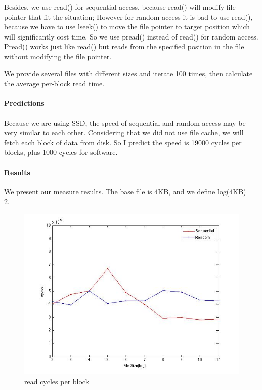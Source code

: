 Besides, we use read() for sequential access, because read() will modify file pointer that fit the situation; However for random access it is bad to use read(), because we have to use lseek() to move the file pointer to target position which will significantly cost time. So we use pread() instead of read() for random access. Pread() works just like read() but reads from the specified position in the file without modifying the file pointer.

We provide several files with different sizes and iterate 100 times, then calculate  the average per-block read time.

\paragraph{Predictions}
Because we are using SSD, the speed of sequential and random access may be very similar to each other. Considering that we did not use file cache, we will fetch each block of data from disk. So I predict the speed is 19000 cycles per blocks, plus 1000 cycles for software.

\paragraph{Results}
We present our measure results. The base file is 4KB, and we define log(4KB) = 2.

\begin{figure}[htbp] %
   \centering
   \includegraphics[width=5in]{./pics/42.jpg} 
   \caption{read cycles per block}
   \label{fig:read cycles per block}
\end{figure}

